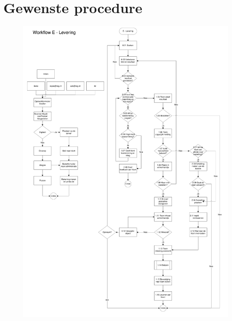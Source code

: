 \documentclass[a4paper,titlepage]{report}
\begin{document}
\section{Gewenste procedure}
\begin{figure}[H]
  \includegraphics[scale=0.7,trim=0mm 180mm 70mm 0mm,page=3]{e-levering.pdf}
\end{figure}
\end{document}
